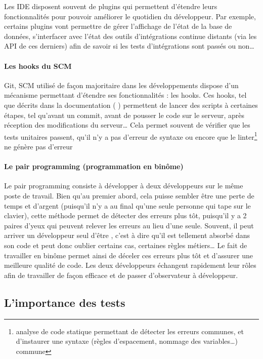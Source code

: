 Les \gls{IDE} disposent souvent de plugins qui permettent d'étendre leurs fonctionnalités pour pouvoir améliorer le quotidien du développeur. Par exemple, certains plugins vont permettre de gérer l'affichage de l'état de la base de données, s'interfacer avec l'état des outils d'intégrations continue distants (via les \gls{API} de ces derniers) afin de savoir si les tests d'intégrations sont passés ou non\ldots

\paragraph{Les hooks du SCM} Git, \gls{SCM} utilisé de façon majoritaire dans les développements dispose d'un mécanisme permettant d'étendre ses fonctionnalités : les hooks. Ces hooks, tel que décrits dans la documentation ( \cite[chapitre 8.3]{git-hook}) permettent de lancer des scripts à certaines étapes, tel qu'avant un commit, avant de pousser le code sur le serveur, après réception des modifications du serveur\ldots{} Cela permet souvent de vérifier que les tests unitaires passent, qu'il n'y a pas d'erreur de syntaxe ou encore que le linter\footnote{analyse de code statique permettant de détecter les erreurs communes, et d'instaurer une syntaxe (règles d'espacement, nommage des variables\ldots) commune} ne génère pas d'erreur

\paragraph{Le pair programming (programmation en binôme)}

Le pair programming consiste à développer à deux développeurs sur le même poste de travail. Bien qu'au premier abord, cela puisse sembler être une perte de temps et d'argent (puisqu'il n'y a au final qu'une seule personne qui tape sur le clavier), cette méthode permet de détecter des erreurs plus tôt, puisqu'il y a 2 paires d'yeux qui peuvent relever les erreurs au lieu d'une seule. Souvent, il peut arriver un développeur seul d'être , c'est à dire qu'il est tellement absorbé dans son code et peut donc oublier certains cas, certaines règles métiers\ldots{} Le fait de travailler en binôme permet ainsi de déceler ces erreurs plus tôt et d'assurer une meilleure qualité de code. Les deux développeurs échangent rapidement leur rôles afin de travailler de façon efficace et de passer d'observateur à développeur. 

\subsection{L'importance des tests} \label{importance-test}

